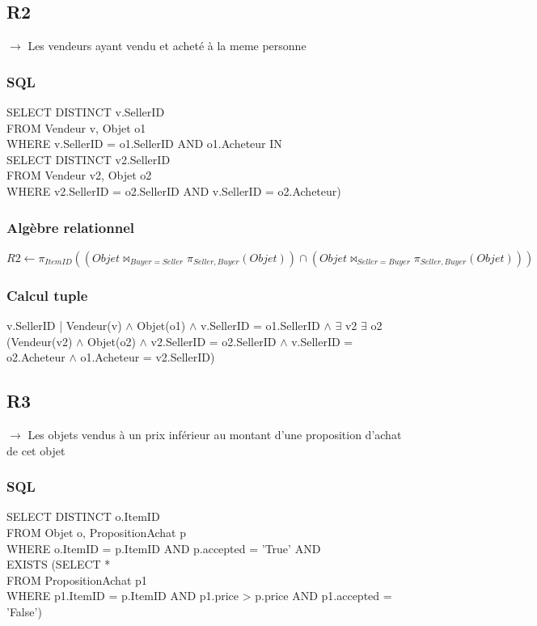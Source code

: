 \documentclass[a4paper,11pt]{article}
\begin{document}
\subsection{R2}
$\rightarrow$ Les vendeurs ayant vendu et acheté à la meme personne



\subsubsection{SQL}

SELECT DISTINCT v.SellerID\\
FROM Vendeur v, Objet o1\\
WHERE v.SellerID = o1.SellerID AND o1.Acheteur IN\\
\indent \indent SELECT DISTINCT v2.SellerID\\
\indent \indent FROM Vendeur v2, Objet o2\\
\indent \indent WHERE v2.SellerID = o2.SellerID AND v.SellerID = o2.Acheteur)
    
\subsubsection{Algèbre relationnel}

$R2 \leftarrow \pi_{ItemID}((Objet \bowtie_{Buyer=Seller} \pi_{Seller,Buyer}(Objet)) 
			    \cap (Objet \bowtie_{Seller=Buyer} \pi_{Seller,Buyer}(Objet)))$

\subsubsection{Calcul tuple}

v.SellerID | Vendeur(v) $\land$ Objet(o1) $\land$ v.SellerID = o1.SellerID $\land$ $\exists$ v2 $\exists$ o2 (Vendeur(v2) $\land$ Objet(o2) $\land$ v2.SellerID = o2.SellerID $\land$ v.SellerID = o2.Acheteur $\land$ o1.Acheteur = v2.SellerID)


\subsection{R3}

$\rightarrow$ Les objets vendus à un prix inférieur au montant d'une proposition d'achat de cet objet

\subsubsection{SQL}

SELECT DISTINCT o.ItemID\\
FROM Objet o, PropositionAchat p\\
WHERE o.ItemID = p.ItemID AND p.accepted = 'True' AND\\
\indent \indent EXISTS (SELECT *\\
\indent \indent FROM PropositionAchat p1\\
\indent \indent WHERE p1.ItemID = p.ItemID AND p1.price > p.price AND p1.accepted = 'False')
        
\end{document}
